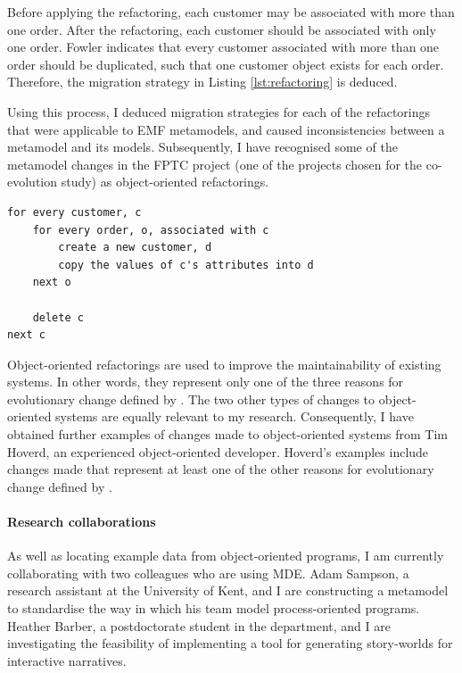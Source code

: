 Before applying the refactoring, each customer may be associated with more than one order. After the refactoring, each customer should be associated with only one order. Fowler indicates that every customer associated with more than one order should be duplicated, such that one customer object exists for each order. Therefore, the migration strategy in Listing \ref{lst:refactoring} is deduced.

Using this process, I deduced migration strategies for each of the refactorings that were applicable to EMF metamodels, and caused inconsistencies between a metamodel and its models. Subsequently, I have recognised some of the metamodel changes in the FPTC project (one of the projects chosen for the co-evolution study) as object-oriented refactorings.

\begin{lstlisting}[caption=Migration strategy for the refactoring in pseudo code., label=lst:refactoring]
for every customer, c
	for every order, o, associated with c
		create a new customer, d
		copy the values of c's attributes into d
	next o
	
	delete c
next c
\end{lstlisting}

Object-oriented refactorings are used to improve the maintainability of existing systems. In other words, they represent only one of the three reasons for evolutionary change defined by \cite{sjoberg93quantifying}. The two other types of changes to object-oriented systems are equally relevant to my research. Consequently, I have obtained further examples of changes made to object-oriented systems from Tim Hoverd, an experienced object-oriented developer. Hoverd's examples include changes made that represent at least one of the other reasons for evolutionary change defined by \cite{sjoberg93quantifying}.



\paragraph{Research collaborations} %
\label{par:collaborations}
As well as locating example data from object-oriented programs, I am currently collaborating with two colleagues who are using MDE. Adam Sampson, a research assistant at the University of Kent, and I are constructing a metamodel to standardise the way in which his team model process-oriented programs. Heather Barber, a postdoctorate student in the department, and I are investigating the feasibility of implementing a tool for generating story-worlds for interactive narratives.

